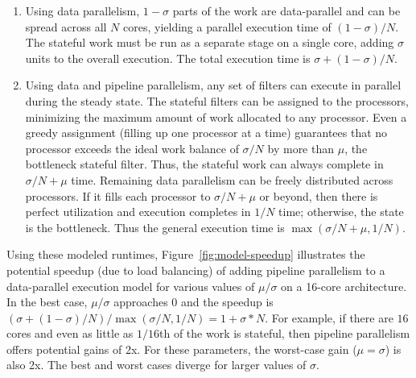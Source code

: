 \begin{enumerate}
\item Using data parallelism, $1-\sigma$ parts of the work are
data-parallel and can be spread across all $N$ cores, yielding a
parallel execution time of $(1-\sigma)/N$.  The stateful work must be
run as a separate stage on a single core, adding $\sigma$ units to the
overall execution.  The total execution time is $\sigma+(1-\sigma)/N$.

\item Using data and pipeline parallelism, any set of filters can
execute in parallel during the steady state.  The stateful filters can
be assigned to the processors, minimizing the maximum amount of work
allocated to any processor.  Even a greedy assignment (filling up one
processor at a time) guarantees that no processor exceeds the ideal
work balance of $\sigma/N$ by more than $\mu$, the bottleneck stateful
filter.  Thus, the stateful work can always complete in $\sigma/N+\mu$
time.  Remaining data parallelism can be freely distributed across
processors.  If it fills each processor to $\sigma/N+\mu$ or beyond,
then there is perfect utilization and execution completes in $1/N$
time; otherwise, the state is the bottleneck.  Thus the general
execution time is $\max(\sigma/N+\mu, 1/N)$.





\end{enumerate}

Using these modeled runtimes, Figure~\ref{fig:model-speedup}
illustrates the potential speedup (due to load balancing) of adding
pipeline parallelism to a data-parallel execution model for various
values of $\mu/\sigma$ on a 16-core architecture.  In the best case,
$\mu/\sigma$ approaches $0$ and the speedup is
$(\sigma+(1-\sigma)/N)/\max(\sigma/N, 1/N) = 1+\sigma*N$.  For
example, if there are $16$ cores and even as little as $1/16$th of the
work is stateful, then pipeline parallelism offers potential gains of
2x.  For these parameters, the worst-case gain ($\mu=\sigma$) is also
2x.  The best and worst cases diverge for larger values of $\sigma$.


